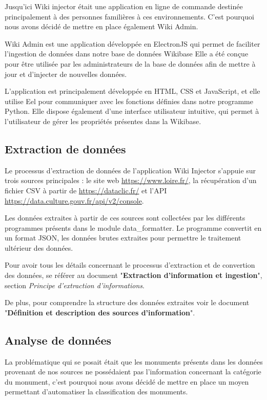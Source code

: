 \documentclass[a4paper, 12pt]{article}
\begin{document}
Jusqu'ici Wiki injector était une application en ligne de commande destinée principalement à des personnes familières à ces environnements. C'est pourquoi nous avons décidé de mettre en place également Wiki Admin.

Wiki Admin est une application développée en ElectronJS qui permet de faciliter l'ingestion de données dans notre base de données Wikibase Elle a été conçue pour être utilisée par les administrateurs de la base de données afin de mettre à jour et d'injecter de nouvelles données.

L'application est principalement développée en HTML, CSS et JavaScript, et elle utilise Eel pour communiquer avec les fonctions définies dans notre programme Python. Elle dispose également d'une interface utilisateur intuitive, qui permet à l'utilisateur de gérer les propriétés présentes dans la Wikibase.


\subsection{Extraction de données}
Le processus d'extraction de données de l'application Wiki Injector s'appuie sur trois sources principales : le site web \href{https://www.loire.fr/jcms/lw_1029499/fr/annuaire-du-patrimoine-et-monuments-de-la-loire}{https://www.loire.fr/}, la récupération d'un fichier CSV à partir de \href{https://dataclic.fr/}{https://dataclic.fr/} et l'API \href{https://data.culture.gouv.fr/api/v2/console}{https://data.culture.gouv.fr/api/v2/console}.

Les données extraites à partir de ces sources sont collectées par les différents programmes présents dans le module data\_formatter. Le programme convertit en un format JSON, les données brutes extraites pour permettre le traitement ultérieur des données.

Pour avoir tous les détails concernant le processus d'extraction et de convertion des données, se référer au document "\textbf{Extraction d’information et ingestion}", section \textit{Principe d’extraction d’informations}.

De plus, pour comprendre la structure des données extraites voir le document "\textbf{Définition et description des sources d’information}".

\newpage
\subsection{Analyse de données}

La problématique qui se posait était que les monuments présents dans les données provenant de nos sources ne possédaient pas l'information concernant la catégorie du monument, c'est pourquoi nous avons décidé de mettre en place un moyen permettant d'automatiser la classification des monuments.
\end{document}
